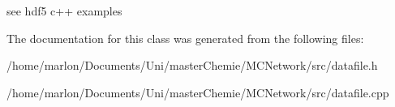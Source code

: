 see hdf5 c++ examples 

The documentation for this class was generated from the following files\+:\begin{DoxyCompactItemize}
\item 
/home/marlon/\+Documents/\+Uni/master\+Chemie/\+M\+C\+Network/src/datafile.\+h\item 
/home/marlon/\+Documents/\+Uni/master\+Chemie/\+M\+C\+Network/src/datafile.\+cpp\end{DoxyCompactItemize}
